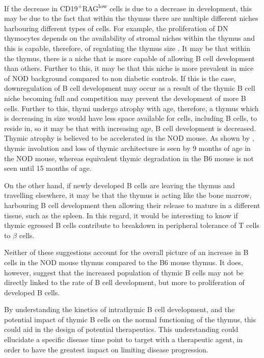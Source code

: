 If the decrease in CD19\textsuperscript{+}RAG\textsuperscript{low} cells is due to a decrease in development, this may be due to the fact that within the thymus there are multiple different niches harbouring different types of cells.
For example, the proliferation of DN thymocytes depends on the availability of stromal niches within the thymus and this is capable, therefore, of regulating the thymus size \citep{Prockop2004}.
It may be that within the thymus, there is a niche that is more capable of allowing B cell development than others.
Further to this, it may be that this niche is more prevalent in mice of NOD background compared to non diabetic controls.
If this is the case, downregulation of B cell development may occur as a result of the thymic B cell niche becoming full and competition may prevent the development of more B cells.
Further to this, thymi undergo atrophy with age, therefore, a thymus which is decreasing in size would have less space available for cells, including B cells, to reside in, so it may be that with increasing age, B cell development is decreased.
Thymic atrophy is believed to be accelerated in the NOD mouse.
As shown by \citet{Ferreira2014}, thymic involution and loss of thymic architecture is seen by 9 months of age in the NOD mouse, whereas equivalent thymic degradation in the B6 mouse is not seen until 15 months of age.

On the other hand, if newly developed B cells are leaving the thymus and travelling elsewhere, it may be that the thymus is acting like the bone marrow, harbouring B cell development then allowing their release to mature in a different tissue, such as the spleen.
In this regard, it would be interesting to know if thymic egressed B cells contribute to breakdown in peripheral tolerance of T cells to $\beta$ cells. 

Neither of these suggestions account for the overall picture of an increase in B cells in the NOD mouse thymus compared to the B6 mouse thymus.
It does, however, suggest that the increased population of thymic B cells may not be directly linked to the rate of B cell development, but more to proliferation of developed B cells.

By understanding the kinetics of intrathymic B cell development, and the potential impact of thymic B cells on the normal functioning of the thymus, this could aid in the design of potential therapeutics.
This understanding could ellucidate a specific disease time point to target with a therapeutic agent, in order to have the greatest impact on limiting disease progression.


